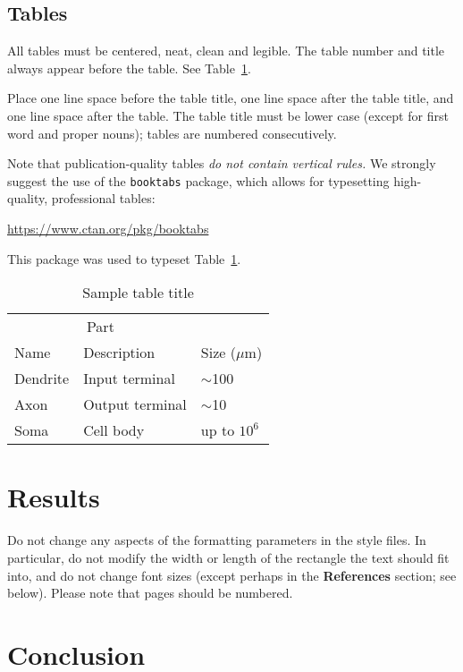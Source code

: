 \documentclass{article}
\begin{document}
	\subsection{Tables}
	
	All tables must be centered, neat, clean and legible.  The table
	number and title always appear before the table.  See
	Table~\ref{sample-table}.
	
	Place one line space before the table title, one line space after the
	table title, and one line space after the table. The table title must
	be lower case (except for first word and proper nouns); tables are
	numbered consecutively.
	
	Note that publication-quality tables \emph{do not contain vertical
		rules.} We strongly suggest the use of the \verb+booktabs+ package,
	which allows for typesetting high-quality, professional tables:
	\begin{center}
		\url{https://www.ctan.org/pkg/booktabs}
	\end{center}
	This package was used to typeset Table~\ref{sample-table}.
	
	\begin{table}[t]
		\caption{Sample table title}
		\label{sample-table}
		\centering
		\begin{tabular}{lll}
			\toprule
			\multicolumn{2}{c}{Part}                   \\
			\cmidrule{1-2}
			Name     & Description     & Size ($\mu$m) \\
			\midrule
			Dendrite & Input terminal  & $\sim$100     \\
			Axon     & Output terminal & $\sim$10      \\
			Soma     & Cell body       & up to $10^6$  \\
			\bottomrule
		\end{tabular}
	\end{table}
	
	\section{Results}
	\label{results}
	
	Do not change any aspects of the formatting parameters in the style
	files.  In particular, do not modify the width or length of the
	rectangle the text should fit into, and do not change font sizes
	(except perhaps in the \textbf{References} section; see below). Please
	note that pages should be numbered.
	
	
	\section{Conclusion}
	\label{conc}
	
\end{document}
